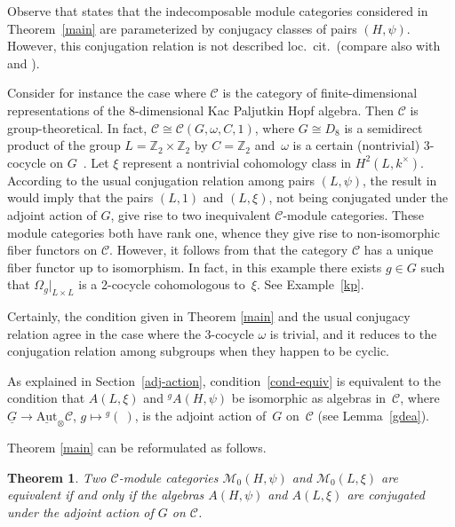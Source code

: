 \documentclass[pdftex]{sigma}
\numberwithin{equation}{section}
\newtheorem{Theorem}{Theorem}[section]
\newcommand{\cch}{\Omega}
\newcommand{\C}{{\mathcal C}}
\newcommand{\M}{{\mathcal M}}
\newcommand{\1}{\textbf{1}}
\begin{document}
Observe that \cite[Theorem 3.1]{ostrik} states that the indecomposable module categories considered in Theorem~\ref{main} are parameterized by conjugacy classes of pairs $(H, \psi)$. However, this conjugation relation is not described loc.\ cit.\ (compare also with \cite{nikshych} and \cite[Section~9.7]{egno}).

 Consider for instance the case where $\C$ is the category of f\/inite-dimensional representations of the 8-dimensional Kac Paljutkin Hopf algebra. Then $\C$ is group-theoretical. In fact, $\C \cong \C(G, \omega, C, 1)$, where $G \cong D_8$ is a semidirect product of the group $L = \mathbb Z_2 \times \mathbb Z_2$ by $C = \mathbb Z_2$ and~$\omega$ is a certain (nontrivial) 3-cocycle on $G$~\cite{schauenburg}. Let $\xi$ represent a nontrivial cohomology class in $H^2(L, k^\times)$. According to the usual conjugation relation among pairs $(L, \psi)$, the result in \cite[Theorem~3.1]{ostrik} would imply that the pairs $(L, 1)$ and $(L, \xi)$, not being conjugated under the adjoint action of $G$, give rise to two inequivalent $\C$-module categories. These module categories both have rank one, whence they give rise to non-isomorphic f\/iber functors on $\C$. However, it follows from \cite[Theorem~4.8(1)]{ma-contemp} that the category $\C$ has a unique f\/iber functor up to isomorphism. In fact, in this example there exists $g \in G$ such that $\cch_g\vert_{L\times L}$ is a 2-cocycle cohomologous to~$\xi$. See Example~\ref{kp}.

Certainly, the condition given in Theorem \ref{main} and the usual conjugacy relation agree in the case where the 3-cocycle $\omega$ is trivial, and it reduces to the conjugation relation among subgroups when they happen to be cyclic.

As explained in Section~\ref{adj-action}, condition~\eqref{cond-equiv} is equivalent to the condition that $A(L, \xi)$ and ${}^gA(H, \psi)$ be isomorphic as algebras in~$\C$, where $\underline{G} \to \underline{\text{Aut}}_\otimes\C$, $g \mapsto {}^g( \ )$, is the adjoint action of~$G$ on~$\C$ (see Lemma~\ref{gdea}).

Theorem \ref{main} can be reformulated as follows.

\begin{Theorem} Two $\C$-module categories $\M_0(H, \psi)$ and $\M_0(L, \xi)$ are equivalent if and only if the algebras $A(H, \psi)$ and $A(L, \xi)$ are conjugated under the adjoint action of $G$ on $\C$.
\end{Theorem}
\end{document}

